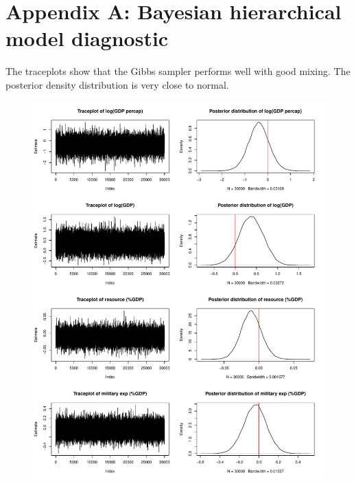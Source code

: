 \section{Appendix A: Bayesian hierarchical model diagnostic}
\label{sec:modeldiagnostic}

The traceplots show that the Gibbs sampler performs well with good mixing. The posterior density distribution is very close to normal.

\begin{figure}[ht]
    \centering
    \includegraphics[width=\textwidth]{../fig/mcmc_diagnostic1}
    \label{fig:mcmc_diagnostic1}
\end{figure}

